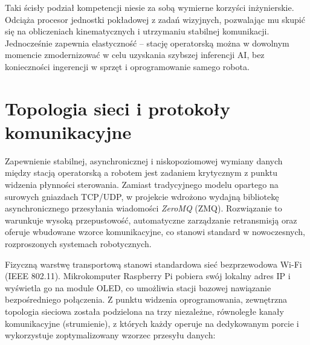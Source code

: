 \documentclass[11pt]{extreport}
\begin{document}
Taki ścisły podział kompetencji niesie za sobą wymierne korzyści inżynierskie. Odciąża procesor jednostki pokładowej z zadań wizyjnych, pozwalając mu skupić się na obliczeniach kinematycznych i utrzymaniu stabilnej komunikacji. Jednocześnie zapewnia elastyczność – stację operatorską można w dowolnym momencie zmodernizować w celu uzyskania szybszej inferencji AI, bez konieczności ingerencji w sprzęt i oprogramowanie samego robota.

\section{Topologia sieci i protokoły komunikacyjne}

Zapewnienie stabilnej, asynchronicznej i niskopoziomowej wymiany danych między stacją operatorską a robotem jest zadaniem krytycznym z punktu widzenia płynności sterowania. Zamiast tradycyjnego modelu opartego na surowych gniazdach TCP/UDP, w projekcie wdrożono wydajną bibliotekę asynchronicznego przesyłania wiadomości \textit{ZeroMQ} (ZMQ). Rozwiązanie to warunkuje wysoką przepustowość, automatyczne zarządzanie retransmisją oraz oferuje wbudowane wzorce komunikacyjne, co stanowi standard w nowoczesnych, rozproszonych systemach robotycznych.

Fizyczną warstwę transportową stanowi standardowa sieć bezprzewodowa Wi-Fi (IEEE 802.11). Mikrokomputer Raspberry Pi pobiera swój lokalny adres IP i wyświetla go na module OLED, co umożliwia stacji bazowej nawiązanie bezpośredniego połączenia. Z punktu widzenia oprogramowania, zewnętrzna topologia sieciowa została podzielona na trzy niezależne, równoległe kanały komunikacyjne (strumienie), z których każdy operuje na dedykowanym porcie i wykorzystuje zoptymalizowany wzorzec przesyłu danych:
\end{document}

